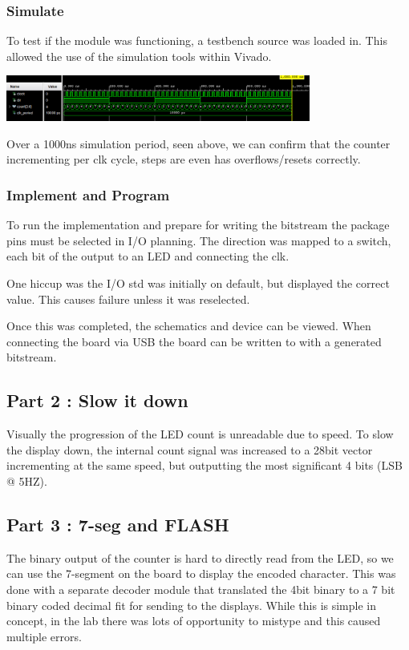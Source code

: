 \documentclass[11pt]{article}
\begin{document}
\begin{preview}
        \subsubsection*{Simulate}
        To test if the module was functioning, a testbench source was loaded in. This allowed the use of the simulation tools within Vivado.
        \begin{center}
                \includegraphics[width=0.75\textwidth]{resource/sim1.PNG}
        \end{center}
        Over a 1000ns simulation period, seen above, we can confirm that the counter incrementing per clk cycle, steps are even has overflows/resets correctly.
        \subsubsection*{Implement and Program}
        To run the implementation and prepare for writing the bitstream the package pins must be selected in I/O planning. The direction was mapped to a switch, each bit of the output to an LED and connecting the clk.

        One hiccup was the I/O std was initially on default, but displayed the correct value. This causes failure unless it was reselected.

        Once this was completed, the schematics and device can be viewed. When connecting the board via USB the board can be written to with a generated bitstream.

        \subsection{Part 2 : Slow it down}
        Visually the progression of the LED count is unreadable due to speed. To slow the display down, the internal count signal was increased to a 28bit vector incrementing at the same speed, but outputting the most significant 4 bits (LSB @ 5HZ).

        \subsection{Part 3 : 7-seg and FLASH}
        The binary output of the counter is hard to directly read from the LED, so we can use the 7-segment on the board to display the encoded character. This was done with a separate decoder module that translated the 4bit binary to a 7 bit binary coded decimal fit for sending to the displays. While this is simple in concept, in the lab there was lots of opportunity to mistype and this caused multiple errors. 


\end{preview}
\end{document}
